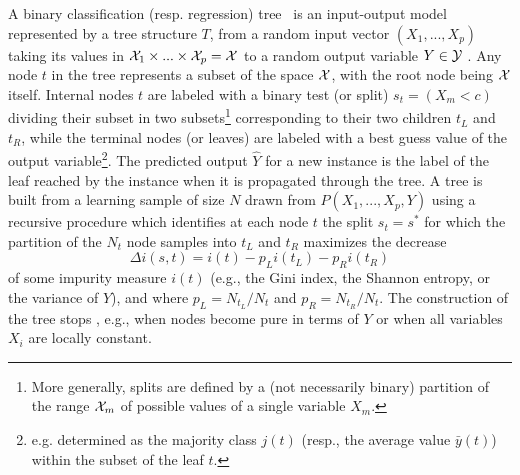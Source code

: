 \documentclass{article}
\begin{document}
A binary classification (resp. regression)  tree~\citep{breiman1984cart}
is an input-output model represented by a tree  structure $T$, from a random input
vector $(X_1, ..., X_p)$ taking its values in ${\cal X}_1 \times ... \times
{\cal X}_p = {\cal X}$ to a random output variable $Y\in {\cal Y}$ . Any node  $t$ in
the tree represents a subset of the space ${\cal X}$, with the root node being
${\cal X}$ itself. Internal nodes $t$ are labeled with a binary test (or split)
$s_t = (X_m < c)$ dividing their subset in two subsets\footnote{More generally, splits are defined by a (not necessarily binary)
partition of the range ${\cal X}_{m}$ of possible values of a single variable
$X_{m}$.} corresponding to their two children $t_L$ and
$t_R$, %
while the terminal nodes (or leaves) are
labeled with a best guess value of the output variable\footnote{e.g. determined as the majority
class $j(t)$ (resp., the average value $\bar{y}(t)$) within the subset of the leaf $t$.}. The
predicted output $\hat{Y}$ for a new instance is the label
of the leaf reached by the instance when it is propagated through the tree. A  tree
is built from a learning sample of size $N$ drawn from $P(X_1, ..., X_p, Y)$
using a recursive procedure which identifies at each node $t$ the split
$s_t=s^*$ for which the partition of the $N_t$ node samples into $t_L$ and $t_R$
maximizes the decrease
\begin{equation}\label{eq:deltaimpurity}
\Delta i(s, t) = i(t) - p_L i(t_L) - p_R i(t_R)
\end{equation}
of some impurity measure $i(t)$ (e.g., the Gini index, the Shannon entropy, or the variance of $Y$), and where $p_L=N_{t_L} / {N_t}$ and $p_R={N_{t_R}}/{N_t}$. The
construction of the tree stops , e.g., when
nodes become pure in terms of $Y$ or when all variables $X_{i}$ are locally constant.


\end{document}
